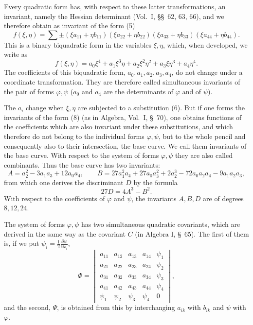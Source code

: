 \documentclass[11pt]{article}
\begin{document}
Every quadratic form has, with respect to these latter transformations, an invariant, namely the Hessian determinant (Vol.~I, \S\S~62, 63, 66), and we therefore obtain as invariant of the form (5)
\begin{equation}
f(\xi,\eta)=\sum\pm(\xi a_{11}+\eta b_{11})(\xi a_{22}+\eta b_{22})(\xi a_{33}+\eta b_{33})(\xi a_{44}+\eta b_{44}).
\tag{7}
\end{equation}
This is a binary biquadratic form in the variables $\xi,\eta$, which, when developed, we write as
\begin{equation}
f(\xi,\eta)=a_0\xi^4+a_1\xi^3\eta+a_2\xi^2\eta^2+a_3\xi\eta^3+a_4\eta^4.
\tag{8}
\end{equation}
The coefficients of this biquadratic form, $a_0,a_1,a_2,a_3,a_4$, do not change under a coordinate transformation. They are therefore called simultaneous invariants of the pair of forms $\varphi,\psi$ ($a_0$ and $a_4$ are the determinants of $\varphi$ and of $\psi$).

The $a_i$ change when $\xi,\eta$ are subjected to a substitution (6). But if one forms the invariants of the form (8) (as in Algebra, Vol.~I, \S~70), one obtains functions of the coefficients which are also invariant under these substitutions, and which therefore do not belong to the individual forms $\varphi,\psi$, but to the whole pencil and consequently also to their intersection, the base curve. We call them invariants of the base curve. With respect to the system of forms $\varphi,\psi$ they are also called combinants. Thus the base curve has two invariants:
\begin{equation}
A=a_2^2-3a_1a_3+12a_0a_4,
\qquad
B=27a_1^2a_4+27a_0a_3^2+2a_2^3-72a_0a_2a_4-9a_1a_2a_3,
\tag{9}
\end{equation}
from which one derives the discriminant $D$ by the formula
\begin{equation}
27D=4A^3-B^2.
\tag{10}
\end{equation}
With respect to the coefficients of $\varphi$ and $\psi$, the invariants $A,B,D$ are of degrees $8,12,24$.

The system of forms $\varphi,\psi$ has two simultaneous quadratic covariants, which are derived in the same way as the covariant $C$ (in Algebra I, \S~65). The first of them is, if we put $\psi_i=\frac12\frac{\partial\psi}{\partial x_i}$,
\begin{equation}
\Phi=
\begin{vmatrix}
a_{11}&a_{12}&a_{13}&a_{14}&\psi_1\\
a_{21}&a_{22}&a_{23}&a_{24}&\psi_2\\
a_{31}&a_{32}&a_{33}&a_{34}&\psi_3\\
a_{41}&a_{42}&a_{43}&a_{44}&\psi_4\\
\psi_1&\psi_2&\psi_3&\psi_4&0
\end{vmatrix},
\tag{11}
\end{equation}
and the second, $\Psi$, is obtained from this by interchanging $a_{ik}$ with $b_{ik}$ and $\psi$ with $\varphi$.
\end{document}
